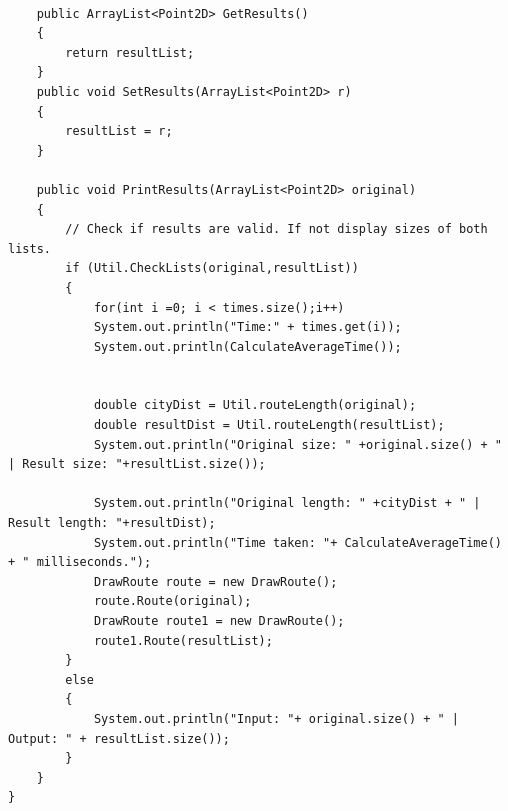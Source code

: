 \documentclass[conference,backref=page]{acmsiggraph}
\begin{document}
\begin{verbatim}
	
	public ArrayList<Point2D> GetResults()
	{
		return resultList;
	}
	public void SetResults(ArrayList<Point2D> r)
	{
		resultList = r;
	}
	
	public void PrintResults(ArrayList<Point2D> original)
	{
		// Check if results are valid. If not display sizes of both lists.
		if (Util.CheckLists(original,resultList))
		{
			for(int i =0; i < times.size();i++)
			System.out.println("Time:" + times.get(i));
			System.out.println(CalculateAverageTime());
			
			
			double cityDist = Util.routeLength(original);
			double resultDist = Util.routeLength(resultList);
			System.out.println("Original size: " +original.size() + " | Result size: "+resultList.size());    
			
			System.out.println("Original length: " +cityDist + " | Result length: "+resultDist);    
			System.out.println("Time taken: "+ CalculateAverageTime() + " milliseconds.");
			DrawRoute route = new DrawRoute();
			route.Route(original);
			DrawRoute route1 = new DrawRoute();
			route1.Route(resultList);
		}
		else
		{	
			System.out.println("Input: "+ original.size() + " | Output: " + resultList.size());
		}
	}
}

\end{verbatim}


\end{document}
